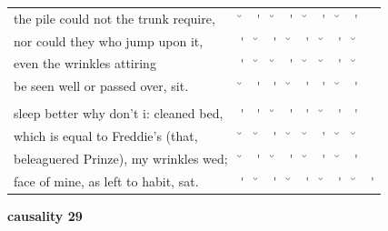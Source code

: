 \documentclass[12pt, landscape]{article}
\begin{document}
\begin{center}
\begin{tabularx}{\textwidth}{
>{\lefting\arraybackslash}X
c
c
c
c
c
c
c
c
c
}

the pile could not the trunk require, & \u{} & \'{} & \u{} & \'{} & \u{} & \'{} & \u{} & \'{} & \\
nor could they who jump upon it, & \'{} & \u{} & \'{} & \u{} & \'{} & \u{} & \'{} & \u{} & \\
even the wrinkles attiring & \'{} & \u{} & \u{} & \'{} & \u{} & \u{} & \'{} & \u{} & \\
be seen well or passed over, sit. & \u{} & \'{} & \'{} & \u{} & \'{} & \'{} & \u{} & \'{} & \\
 & & & & & & & & \\
sleep better why don't i: cleaned bed, & \'{} & \'{} & \u{} & \'{} & \'{} & \u{} & \'{} & \'{} & \\
which is equal to Freddie's (that, & \u{} & \u{} & \'{} & \u{} & \u{} & \'{} & \u{} & \u{} & \\
beleaguered Prinze), my wrinkles wed; & \u{} & \'{} & \u{} & \'{} & \u{} & \'{} & \u{} & \'{} & \\
face of mine, as left to habit, sat. & \'{} & \u{} & \'{} & \u{} & \'{} & \u{} & \'{} & \u{} & \'{} \\

\end{tabularx}
\end{center}

\vspace*{\fill}

\newpage

\vspace*{\fill}

\noindent \textbf{causality 29}
\noindent \hfill \par
\end{document}
